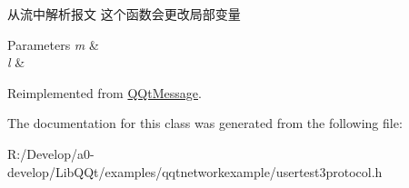 从流中解析报文 这个函数会更改局部变量 


\begin{DoxyParams}{Parameters}
{\em m} & \\
\hline
{\em l} & \\
\hline
\end{DoxyParams}


Reimplemented from \mbox{\hyperlink{class_q_qt_message_a0bc25669bdd61490b1d8df6d77565f31}{Q\+Qt\+Message}}.



The documentation for this class was generated from the following file\+:\begin{DoxyCompactItemize}
\item 
R\+:/\+Develop/a0-\/develop/\+Lib\+Q\+Qt/examples/qqtnetworkexample/usertest3protocol.\+h\end{DoxyCompactItemize}
